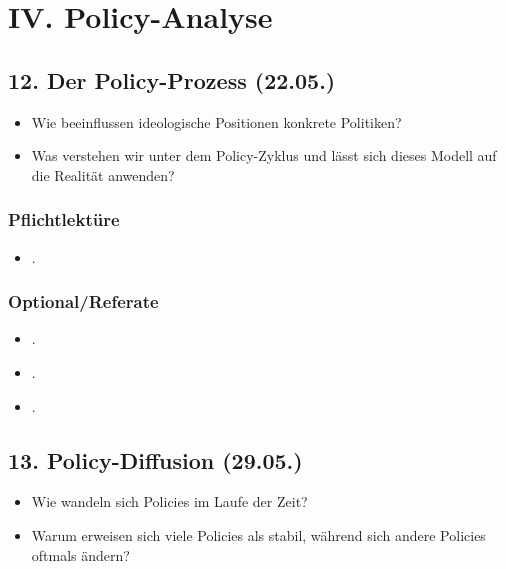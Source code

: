 \documentclass[abstract=on,parskip=full,headings=standardclasses,fontsize=11pt,paper=a4]{scrartcl}
\begin{document}
\section{IV. Policy-Analyse}

\subsection{12. Der Policy-Prozess (22.05.)}


\begin{itemize}
\renewcommand\labelitemi{--}
\item Wie beeinflussen ideologische Positionen konkrete Politiken?
\item Was verstehen wir unter dem Policy-Zyklus und lässt sich dieses Modell auf die Realität anwenden?
\end{itemize}




\subsubsection*{Pflichtlektüre}
\begin{itemize}
\item {}.
\end{itemize}
 
 
 
\subsubsection*{Optional/Referate}
\begin{itemize}
\item {}.
\item {}.
\item {}.
\end{itemize}


\subsection{13. Policy-Diffusion (29.05.)}


\begin{itemize}
\renewcommand\labelitemi{--}
\item Wie wandeln sich Policies im Laufe der Zeit?
\item Warum erweisen sich viele Policies als stabil, während sich andere Policies oftmals ändern?
\end{itemize}
\end{document}

